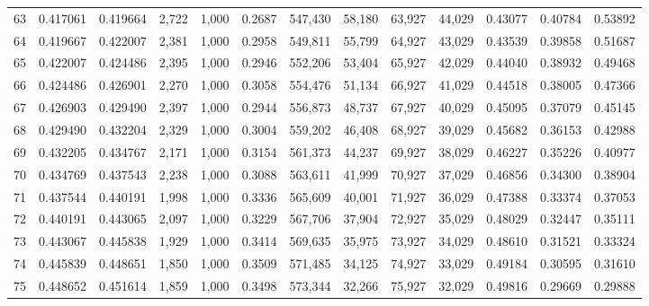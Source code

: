 \begin{tabular}{rrrrrrrrrrrrr}
63  &  0.417061 &  0.419664 &   2,722 &  1,000 &                                     0.2687 &  547,430 &   58,180 &   63,927 &   44,029 &  0.43077 &  0.40784 &  0.53892 \\
64  &  0.419667 &  0.422007 &   2,381 &  1,000 &                                     0.2958 &  549,811 &   55,799 &   64,927 &   43,029 &  0.43539 &  0.39858 &  0.51687 \\
65  &  0.422007 &  0.424486 &   2,395 &  1,000 &                                     0.2946 &  552,206 &   53,404 &   65,927 &   42,029 &  0.44040 &  0.38932 &  0.49468 \\
66  &  0.424486 &  0.426901 &   2,270 &  1,000 &                                     0.3058 &  554,476 &   51,134 &   66,927 &   41,029 &  0.44518 &  0.38005 &  0.47366 \\
67  &  0.426903 &  0.429490 &   2,397 &  1,000 &                                     0.2944 &  556,873 &   48,737 &   67,927 &   40,029 &  0.45095 &  0.37079 &  0.45145 \\
68  &  0.429490 &  0.432204 &   2,329 &  1,000 &                                     0.3004 &  559,202 &   46,408 &   68,927 &   39,029 &  0.45682 &  0.36153 &  0.42988 \\
69  &  0.432205 &  0.434767 &   2,171 &  1,000 &                                     0.3154 &  561,373 &   44,237 &   69,927 &   38,029 &  0.46227 &  0.35226 &  0.40977 \\
70  &  0.434769 &  0.437543 &   2,238 &  1,000 &                                     0.3088 &  563,611 &   41,999 &   70,927 &   37,029 &  0.46856 &  0.34300 &  0.38904 \\
71  &  0.437544 &  0.440191 &   1,998 &  1,000 &                                     0.3336 &  565,609 &   40,001 &   71,927 &   36,029 &  0.47388 &  0.33374 &  0.37053 \\
72  &  0.440191 &  0.443065 &   2,097 &  1,000 &                                     0.3229 &  567,706 &   37,904 &   72,927 &   35,029 &  0.48029 &  0.32447 &  0.35111 \\
73  &  0.443067 &  0.445838 &   1,929 &  1,000 &                                     0.3414 &  569,635 &   35,975 &   73,927 &   34,029 &  0.48610 &  0.31521 &  0.33324 \\
74  &  0.445839 &  0.448651 &   1,850 &  1,000 &                                     0.3509 &  571,485 &   34,125 &   74,927 &   33,029 &  0.49184 &  0.30595 &  0.31610 \\
75  &  0.448652 &  0.451614 &   1,859 &  1,000 &                                     0.3498 &  573,344 &   32,266 &   75,927 &   32,029 &  0.49816 &  0.29669 &  0.29888 \\

\end{tabular}
